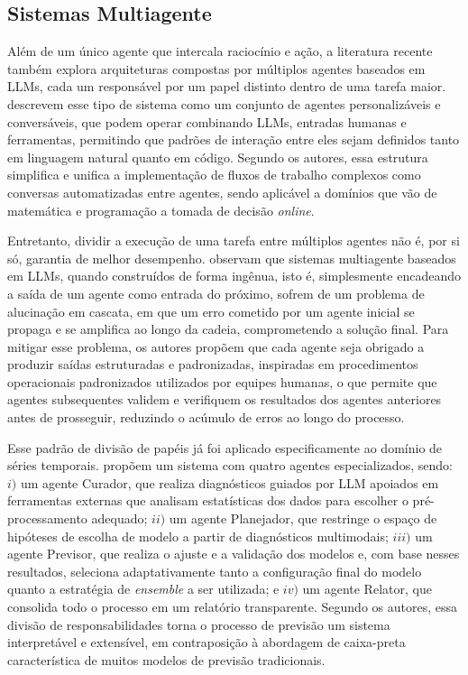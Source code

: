 \subsection{Sistemas Multiagente}
\label{subsec:multiagentes}

Além de um único agente que intercala raciocínio e ação, a literatura recente também explora arquiteturas compostas por múltiplos agentes baseados em LLMs, cada um responsável por um papel distinto dentro de uma tarefa maior. \citet{wu2023autogen} descrevem esse tipo de sistema como um conjunto de agentes personalizáveis e conversáveis, que podem operar combinando LLMs, entradas humanas e ferramentas, permitindo que padrões de interação entre eles sejam definidos tanto em linguagem natural quanto em código. Segundo os autores, essa estrutura simplifica e unifica a implementação de fluxos de trabalho complexos como conversas automatizadas entre agentes, sendo aplicável a domínios que vão de matemática e programação a tomada de decisão \textit{online}.

Entretanto, dividir a execução de uma tarefa entre múltiplos agentes não é, por si só, garantia de melhor desempenho. \citet{hong2024metagpt} observam que sistemas multiagente baseados em LLMs, quando construídos de forma ingênua, isto é, simplesmente encadeando a saída de um agente como entrada do próximo, sofrem de um problema de alucinação em cascata, em que um erro cometido por um agente inicial se propaga e se amplifica ao longo da cadeia, comprometendo a solução final. Para mitigar esse problema, os autores propõem que cada agente seja obrigado a produzir saídas estruturadas e padronizadas, inspiradas em procedimentos operacionais padronizados utilizados por equipes humanas, o que permite que agentes subsequentes validem e verifiquem os resultados dos agentes anteriores antes de prosseguir, reduzindo o acúmulo de erros ao longo do processo.

Esse padrão de divisão de papéis já foi aplicado especificamente ao domínio de séries temporais. \citet{zhao2025timeseriesscientist} propõem um sistema com quatro agentes especializados, sendo: $i)$ um agente Curador, que realiza diagnósticos guiados por LLM apoiados em ferramentas externas que analisam estatísticas dos dados para escolher o pré-processamento adequado; $ii)$ um agente Planejador, que restringe o espaço de hipóteses de escolha de modelo a partir de diagnósticos multimodais; $iii)$ um agente Previsor, que realiza o ajuste e a validação dos modelos e, com base nesses resultados, seleciona adaptativamente tanto a configuração final do modelo quanto a estratégia de \textit{ensemble} a ser utilizada; e $iv)$ um agente Relator, que consolida todo o processo em um relatório transparente. Segundo os autores, essa divisão de responsabilidades torna o processo de previsão um sistema interpretável e extensível, em contraposição à abordagem de caixa-preta característica de muitos modelos de previsão tradicionais.

